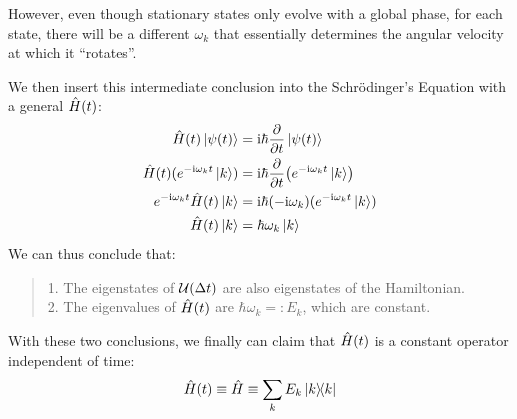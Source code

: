 However, even though stationary states only evolve with a global phase, for each state, there will be a different $\omega_k$ that essentially determines the angular velocity at which it ``rotates''. \par
We then insert this intermediate conclusion into the Schr\"odinger's Equation with a general $\hat{H}(t)$:
\begin{align*}
    \hat{H}(t)\ket{\psi(t)} &= \mathrm{i} \hbar \pdv{t}\ket{\psi(t)} \\
    \hat{H}(t)(e^{-\mathrm{i} \omega_k t}\ket{k}) &= \mathrm{i} \hbar \pdv{t}(e^{-\mathrm{i} \omega_k t}\ket{k}) \\
    e^{-\mathrm{i} \omega_k t}\hat{H}(t)\ket{k} &= \mathrm{i} \hbar (-\mathrm{i} \omega_k)(e^{-\mathrm{i} \omega_k t}\ket{k}) \\
    \hat{H}(t)\ket{k} &= \hbar \omega_k \ket{k}
\end{align*}
We can thus conclude that:
\begin{quote}
    1. The eigenstates of $\mathcal{U}(\Delta t)$ are also eigenstates of the Hamiltonian. \\
    2. The eigenvalues of $\hat{H}(t)$ are $\hbar \omega_k =: E_k$, which are constant.
\end{quote}
With these two conclusions, we finally can claim that $\hat{H}(t)$ is a constant operator independent of time:
$$\hamiltonian(t) \equiv \hamiltonian \equiv \Sumi{k}E_k\dyad{k}$$

